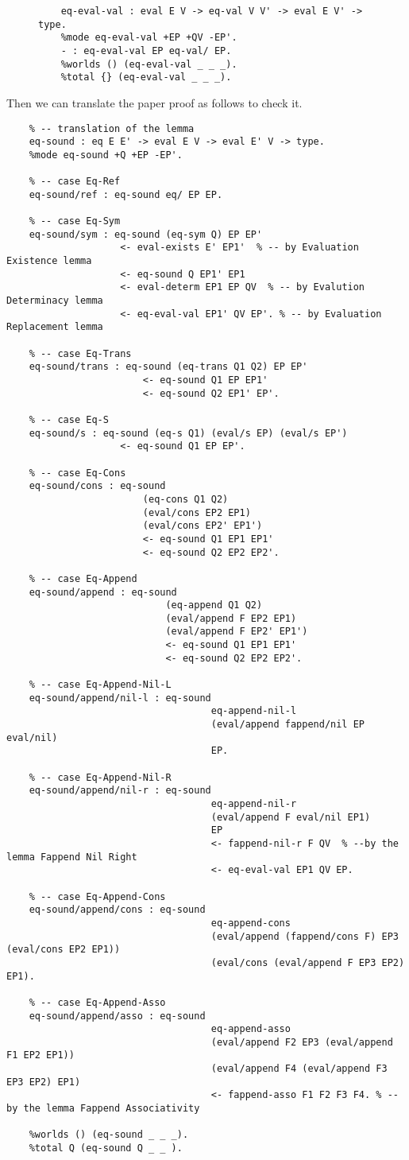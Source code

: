 \documentclass[a4paper]{article}
\theoremstyle{plain}
\begin{document}
\begin{figure}[H]
\begin{lstlisting}
	eq-eval-val : eval E V -> eq-val V V' -> eval E V' -> type.
	%mode eq-eval-val +EP +QV -EP'.
	- : eq-eval-val EP eq-val/ EP.
	%worlds () (eq-eval-val _ _ _).
	%total {} (eq-eval-val _ _ _). 
\end{lstlisting}
\end{figure}

Then we can translate the paper proof as follows to check it.

\begin{lstlisting}
	% -- translation of the lemma
	eq-sound : eq E E' -> eval E V -> eval E' V -> type.  
	%mode eq-sound +Q +EP -EP'. 
	
	% -- case Eq-Ref
	eq-sound/ref : eq-sound eq/ EP EP. 
	
	% -- case Eq-Sym
	eq-sound/sym : eq-sound (eq-sym Q) EP EP'
					<- eval-exists E' EP1'  % -- by Evaluation Existence lemma
					<- eq-sound Q EP1' EP1
					<- eval-determ EP1 EP QV  % -- by Evalution Determinacy lemma
					<- eq-eval-val EP1' QV EP'. % -- by Evaluation Replacement lemma
	
	% -- case Eq-Trans
	eq-sound/trans : eq-sound (eq-trans Q1 Q2) EP EP'
						<- eq-sound Q1 EP EP1'
						<- eq-sound Q2 EP1' EP'.
	
	% -- case Eq-S
	eq-sound/s : eq-sound (eq-s Q1) (eval/s EP) (eval/s EP')
					<- eq-sound Q1 EP EP'.
	
	% -- case Eq-Cons
	eq-sound/cons : eq-sound
						(eq-cons Q1 Q2)
						(eval/cons EP2 EP1)
						(eval/cons EP2' EP1')
						<- eq-sound Q1 EP1 EP1'
						<- eq-sound Q2 EP2 EP2'.
		
	% -- case Eq-Append
	eq-sound/append : eq-sound
							(eq-append Q1 Q2)
							(eval/append F EP2 EP1)
							(eval/append F EP2' EP1')
							<- eq-sound Q1 EP1 EP1'
							<- eq-sound Q2 EP2 EP2'.
	
	% -- case Eq-Append-Nil-L
	eq-sound/append/nil-l : eq-sound
									eq-append-nil-l
									(eval/append fappend/nil EP eval/nil)
									EP.
	
	% -- case Eq-Append-Nil-R
	eq-sound/append/nil-r : eq-sound
									eq-append-nil-r  
									(eval/append F eval/nil EP1)
									EP
									<- fappend-nil-r F QV  % --by the lemma Fappend Nil Right
									<- eq-eval-val EP1 QV EP.
			
	% -- case Eq-Append-Cons
	eq-sound/append/cons : eq-sound
									eq-append-cons 
									(eval/append (fappend/cons F) EP3 (eval/cons EP2 EP1))
									(eval/cons (eval/append F EP3 EP2) EP1).
	
	% -- case Eq-Append-Asso
	eq-sound/append/asso : eq-sound
									eq-append-asso
									(eval/append F2 EP3 (eval/append F1 EP2 EP1))
									(eval/append F4 (eval/append F3 EP3 EP2) EP1)
									<- fappend-asso F1 F2 F3 F4. % -- by the lemma Fappend Associativity
			
	%worlds () (eq-sound _ _ _).
	%total Q (eq-sound Q _ _ ).
	
	
\end{lstlisting}
\end{document}
